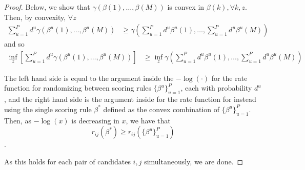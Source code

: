 \documentclass[10pt]{article}
\begin{document}
\begin{ReviewVerbatim}
\begin{proof}
	Below, we show that $\gamma(\beta(1) , \dots, \beta(M))$  is convex in $\beta(k), \forall k, z$. Then, by convexity, $\forall z$
	\begin{align*}
	\sum_{u=1}^{P} d^u \gamma(\beta^u(1), \dots, \beta^u(M))& \geq
	\gamma\left(\sum_{u=1}^{P} d^u\beta^u(1) , \dots, \sum_{u=1}^{P} d^u\beta^u(M)\right)
	\end{align*}
	and so
	\begin{align*}
	\inf_z\left[\sum_{u=1}^{P} d^u \gamma(\beta^u(1), \dots, \beta^u(M))\right]& \geq
	\inf_z \gamma\left(\sum_{u=1}^{P} d^u\beta^u(1) , \dots, \sum_{u=1}^{P} d^u\beta^u(M)\right)
	\end{align*}

	The left hand side is equal to the argument inside the $-\log(\cdot)$ for the rate function for randomizing between scoring rules $\{\beta^u\}_{u=1}^P$, each with probability $d^u$, and the right hand side is the argument inside for the rate function for instead using the single scoring rule $\beta^*$ defined as the convex combination of $\{\beta^u\}_{u=1}^P$. Then, as $-\log(x)$ is decreasing in $x$, we have that \[r_{ij}(\beta^*) \geq r_{ij}(\{\beta^u\}_{u=1}^P)\].

	As this holds for each pair of candidates $i,j$ simultaneously, we are done.






\end{proof}
\end{ReviewVerbatim}
\end{document}
